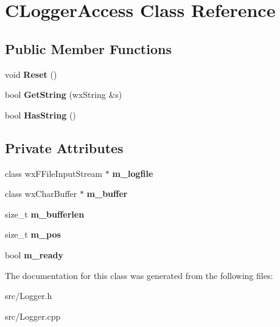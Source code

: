 \section{CLoggerAccess Class Reference}
\label{classCLoggerAccess}
\subsection*{Public Member Functions}
\begin{DoxyCompactItemize}
\item 
void {\bfseries Reset} ()\label{classCLoggerAccess_abc180288d596ae2c9ab521cf6d583036}

\item 
bool {\bfseries GetString} (wxString \&s)\label{classCLoggerAccess_a706d020e2f49312480c92dd647364096}

\item 
bool {\bfseries HasString} ()\label{classCLoggerAccess_a275aef5f01e900adab0bcf2628c1dbd6}

\end{DoxyCompactItemize}
\subsection*{Private Attributes}
\begin{DoxyCompactItemize}
\item 
class wxFFileInputStream $\ast$ {\bfseries m\_\-logfile}\label{classCLoggerAccess_a1b47930d6f445510adb54904e31ad81e}

\item 
class wxCharBuffer $\ast$ {\bfseries m\_\-buffer}\label{classCLoggerAccess_abd3a8fc55c3843901c37b5d87098aca6}

\item 
size\_\-t {\bfseries m\_\-bufferlen}\label{classCLoggerAccess_a42f5aeddc07b6ccadcd8836c3332fadc}

\item 
size\_\-t {\bfseries m\_\-pos}\label{classCLoggerAccess_a1fe9dae557a268497d231ed0985f263c}

\item 
bool {\bfseries m\_\-ready}\label{classCLoggerAccess_aa55c00097a7ef9122f4bb1ee53622f4b}

\end{DoxyCompactItemize}


The documentation for this class was generated from the following files:\begin{DoxyCompactItemize}
\item 
src/Logger.h\item 
src/Logger.cpp\end{DoxyCompactItemize}

